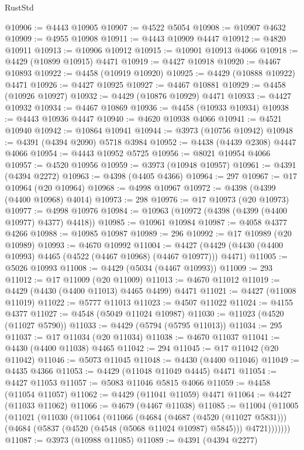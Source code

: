 \begin{lexlean}{RustStd}
\begin{coremodule}
{\begin{coremodule}
{{{{{{{{{{{{{{{{{{{{{{{{{{{{{{{{{{{{{{{{{{{{{{{{{{{{{{{{{{{{{{{{{{{{@10906 := @4443 @10905
@10907 := @4522 @5054
@10908 := @10907 @4632
@10909 := @4955 @10908
@10911 := @4443 @10909 @4447
@10912 := @4820 @10911
@10913 := @10906 @10912
@10915 := @10901 @10913 @4066
@10918 := @4429 (@10899 @10915) @4471
@10919 := @4427 @10918
@10920 := @4467 @10893
@10922 := @4458 (@10919 @10920)
@10925 := @4429 (@10888 @10922) @4471
@10926 := @4427 @10925
@10927 := @4467 @10881
@10929 := @4458 (@10926 @10927)
@10932 := @4429 (@10876 @10929) @4471
@10933 := @4427 @10932
@10934 := @4467 @10869
@10936 := @4458 (@10933 @10934)
@10938 := @4443 @10936 @4447
@10940 := @4620 @10938 @4066
@10941 := @4521 @10940
@10942 := @10864 @10941
@10944 := @3973 (@10756 @10942)
@10948 := @4391 (@4394 @2090) @5718 @3984
@10952 := @4438 (@4439 @2308) @4447 @4066
@10954 := @4443 @10952 @5725
@10956 := @8021 @10954 @4066
@10957 := @4520 @10956
@10959 := @3973 (@10948 @10957)
@10961 := @4391 (@4394 @2272)
@10963 := @4398 (@4405 @4366)
@10964 := 297
@10967 := @17 @10964 (@20 @10964)
@10968 := @4998 @10967
@10972 := @4398 (@4399 (@4400 @10968) @4014)
@10973 := 298
@10976 := @17 @10973 (@20 @10973)
@10977 := @4998 @10976
@10984 := @10963 (@10972 (@4398 (@4399 (@4400 @10977) @4377) @4418))
@10985 := @10961 @10984
@10987 := @4058 @4377 @4266
@10988 := @10985 @10987
@10989 := 296
@10992 := @17 @10989 (@20 @10989)
@10993 := @4670 @10992
@11004 := @4427 (@4429 (@4430 (@4400 @10993) @4465 (@4522 (@4467 @10968) (@4467 @10977))) @4471)
@11005 := @5026 @10993
@11008 := @4429 (@5034 (@4467 @10993))
@11009 := 293
@11012 := @17 @11009 (@20 @11009)
@11013 := @4670 @11012
@11019 := @4429 (@4430 (@4400 @11013) @4465 @4499) @4471
@11021 := @4427 (@11008 @11019)
@11022 := @5777 @11013
@11023 := @4507 @11022
@11024 := @4155 @4377
@11027 := @4548 (@5049 @11024 @10987)
@11030 := @11023 (@4520 (@11027 @5790))
@11033 := @4429 (@5794 (@5795 @11013))
@11034 := 295
@11037 := @17 @11034 (@20 @11034)
@11038 := @4670 @11037
@11041 := @4430 (@4400 @11038) @4465
@11042 := 294
@11045 := @17 @11042 (@20 @11042)
@11046 := @5073 @11045
@11048 := @4430 (@4400 @11046)
@11049 := @4435 @4366
@11053 := @4429 (@11048 @11049 @4445) @4471
@11054 := @4427 @11053
@11057 := @5083 @11046 @5815 @4066
@11059 := @4458 (@11054 @11057)
@11062 := @4429 (@11041 @11059) @4471
@11064 := @4427 (@11033 @11062)
@11066 := @4679 (@4467 @11038)
@11085 := @11004
    (@11005
      (@11021
        (@11030
          (@11064
            (@11066
              (@4684
                (@4687 (@4520 (@11027 @5831)))
                (@4684 (@5837 (@4520 (@4548 (@5068 @11024 @10987) @5845))) @4721)))))))
@11087 := @3973 (@10988 @11085)
@11089 := @4391 (@4394 @2277)
}}}}}}}}}}}}}}}}}}}}}}}}}}}}}}}}}}}}}}}}}}}}}}}}}}}}}}}}}}}}}}}}}}}}
\end{coremodule}}
\end{coremodule}
\end{lexlean}
